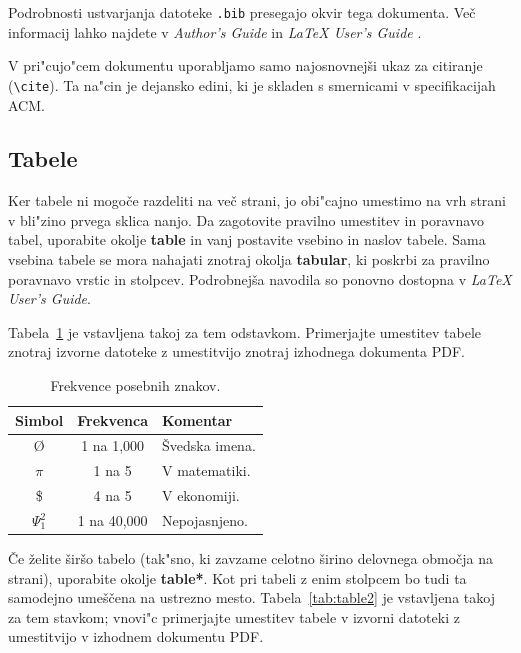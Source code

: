\documentclass[sigconf,nonacm]{acmart}
\begin{document}
Podrobnosti ustvarjanja datoteke \texttt{.bib} presegajo okvir tega dokumenta.
Več informacij lahko najdete v \emph{Author's Guide} in \emph{\LaTeX{} User's
Guide} \cite{Lamport:LaTeX}.

V pri"cujo"cem dokumentu uporabljamo samo najosnovnejši ukaz za citiranje
(\texttt{\textbackslash{}cite}).  Ta na"cin je dejansko edini, ki je skladen s
smernicami v specifikacijah ACM\@.

\subsection{Tabele}

Ker tabele ni mogoče razdeliti na več strani, jo obi"cajno umestimo na vrh
strani v bli"zino prvega sklica nanjo.  Da zagotovite pravilno umestitev in
poravnavo tabel, uporabite okolje \textbf{table} in vanj postavite vsebino in
naslov tabele.  Sama vsebina tabele se mora nahajati znotraj okolja
\textbf{tabular}, ki poskrbi za pravilno poravnavo vrstic in stolpcev.
Podrobnejša navodila so ponovno dostopna v \emph{\LaTeX{} User's Guide}.
    
Tabela~\ref{tab:table1} je vstavljena takoj za tem odstavkom.  Primerjajte
umestitev tabele znotraj izvorne datoteke z umestitvijo znotraj izhodnega
dokumenta PDF\@.

\begin{table}
    \centering
    \caption{Frekvence posebnih znakov.}
    \label{tab:table1}
    \begin{tabular}{ccl}
        \toprule
        Simbol&Frekvenca&Komentar\\
        \midrule
        \O & 1 na 1,000& Švedska imena.\\
        $\pi$ & 1 na 5& V matematiki.\\
        \$ & 4 na 5 & V ekonomiji.\\
        $\Psi^2_1$ & 1 na 40,000& Nepojasnjeno. \\
        \bottomrule
    \end{tabular}
\end{table}

Če želite širšo tabelo (tak"sno, ki zavzame celotno širino delovnega območja
na strani), uporabite okolje \textbf{table*}.  Kot pri tabeli z enim stolpcem
bo tudi ta samodejno umeščena na ustrezno mesto.  Tabela~\ref{tab:table2} je
vstavljena takoj za tem stavkom; vnovi"c primerjajte umestitev tabele v
izvorni datoteki z umestitvijo v izhodnem dokumentu PDF\@.
\end{document}
